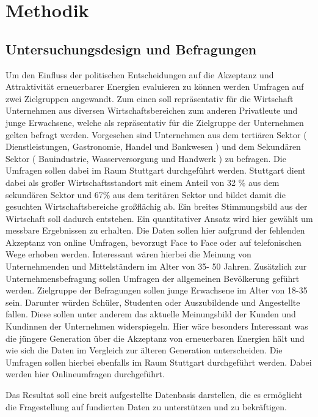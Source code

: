 \documentclass[12pt,a4paper]{article}
\begin{document}
\section*{Methodik}
\subsection*{Untersuchungsdesign und Befragungen }
Um den Einfluss der politischen Entscheidungen auf die Akzeptanz und Attraktivität 
erneuerbarer Energien evaluieren zu können werden Umfragen auf zwei Zielgruppen angewandt. 
Zum einen soll repräsentativ für die Wirtschaft Unternehmen aus diversen Wirtschaftsbereichen 
zum anderen Privatleute und junge Erwachsene, welche als repräsentativ für die Zielgruppe der Unternehmen 
gelten befragt werden. Vorgesehen sind Unternehmen aus dem tertiären Sektor 
( Dienstleistungen, Gastronomie, Handel und Bankwesen ) und dem Sekundären Sektor
( Bauindustrie, Wasserversorgung und Handwerk )  zu befragen. 
Die Umfragen sollen dabei im Raum Stuttgart durchgeführt werden. Stuttgart dient dabei als großer 
Wirtschaftsstandort mit einem Anteil von 32 \% aus dem sekundären Sektor und 67\% aus 
dem teritären Sektor und bildet damit die gesuchten Wirtschaftsbereiche großflächig ab. 
Ein breites Stimmungsbild aus der Wirtschaft soll dadurch entstehen. Ein quantitativer Ansatz 
wird hier gewählt um messbare Ergebnissen zu erhalten. Die Daten sollen hier aufgrund der fehlenden 
Akzeptanz von online Umfragen, bevorzugt Face to Face oder auf telefonischen Wege erhoben werden. 
Interessant wären hierbei die Meinung von Unternehmenden und Mittelständern im Alter von 35- 50 Jahren. 
Zusätzlich zur Unternehmensbefragung sollen Umfragen der allgemeinen Bevölkerung geführt werden. 
Zielgruppe der Befragungen sollen junge Erwachsene im Alter von 18-35 sein. Darunter würden Schüler, 
Studenten oder Auszubildende und Angestellte fallen. Diese sollen unter anderem das aktuelle Meinungsbild 
der Kunden und Kundinnen der Unternehmen widerspiegeln. Hier wäre besonders Interessant was die jüngere Generation 
über die Akzeptanz von erneuerbaren Energien hält und wie sich die Daten im Vergleich zur älteren Generation unterscheiden. 
Die Umfragen sollen hierbei ebenfalls im Raum Stuttgart durchgeführt werden. Dabei werden hier Onlineumfragen durchgeführt. 

Das Resultat soll eine breit aufgestellte Datenbasis darstellen, die es ermöglicht die Fragestellung auf fundierten Daten zu unterstützen und zu bekräftigen.  
\end{document}
